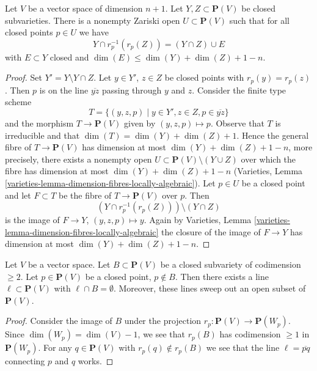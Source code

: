 \begin{lemma}
\label{lemma-projection-injective}
Let $V$ be a vector space of dimension $n + 1$.
Let $Y, Z \subset \mathbf{P}(V)$ be closed subvarieties.
There is a nonempty Zariski open $U \subset \mathbf{P}(V)$
such that for all closed points $p \in U$ we have
$$
Y \cap r_p^{-1}(r_p(Z)) = (Y \cap Z) \cup E
$$
with $E \subset Y$ closed and
$\dim(E) \leq \dim(Y) + \dim(Z) + 1 - n$.
\end{lemma}

\begin{proof}
Set $Y' = Y \setminus Y \cap Z$.
Let $y \in Y'$, $z \in Z$ be closed points with $r_p(y) = r_p(z)$.
Then $p$ is on the line $\overline{yz}$ passing through $y$ and $z$.
Consider the finite type scheme
$$
T = \{(y, z, p) \mid y \in Y', z \in Z, p \in \overline{yz}\}
$$
and the morphism $T \to \mathbf{P}(V)$ given by $(y, z, p) \mapsto p$.
Observe that $T$ is irreducible and that $\dim(T) = \dim(Y) + \dim(Z) + 1$.
Hence the general fibre of $T \to \mathbf{P}(V)$ has dimension at most
$\dim(Y) + \dim(Z) + 1 - n$, more precisely, there exists a nonempty
open $U \subset \mathbf{P}(V) \setminus (Y \cup Z)$ over
which the fibre has dimension at most $\dim(Y) + \dim(Z) + 1 - n$
(Varieties, Lemma \ref{varieties-lemma-dimension-fibres-locally-algebraic}).
Let $p \in U$ be a closed point and let $F \subset T$ be the fibre
of $T \to \mathbf{P}(V)$ over $p$. Then
$$
(Y \cap r_p^{-1}(r_p(Z))) \setminus (Y \cap Z)
$$
is the image of $F \to Y$, $(y, z, p) \mapsto y$. Again by
Varieties, Lemma \ref{varieties-lemma-dimension-fibres-locally-algebraic}
the closure of the image of $F \to Y$ has dimension at most
$\dim(Y) + \dim(Z) + 1 - n$.
\end{proof}

\begin{lemma}
\label{lemma-find-lines}
Let $V$ be a vector space. Let $B \subset \mathbf{P}(V)$
be a closed subvariety of codimension $\geq 2$.
Let $p \in \mathbf{P}(V)$ be a closed point, $p \not \in B$.
Then there exists a line $\ell \subset \mathbf{P}(V)$
with $\ell \cap B = \emptyset$. Moreover, these lines
sweep out an open subset of $\mathbf{P}(V)$.
\end{lemma}

\begin{proof}
Consider the image of $B$ under the projection
$r_p : \mathbf{P}(V) \to \mathbf{P}(W_p)$.
Since $\dim(W_p) = \dim(V) - 1$, we see that $r_p(B)$
has codimension $\geq 1$ in $\mathbf{P}(W_p)$.
For any $q \in \mathbf{P}(V)$ with $r_p(q) \not \in r_p(B)$
we see that the line $\ell = \overline{pq}$ connecting $p$ and $q$ works.
\end{proof}

